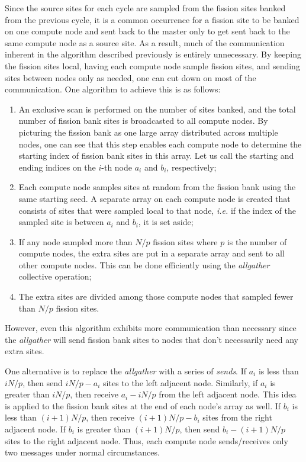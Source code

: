 Since the source sites for each cycle are sampled from the fission
sites banked from the previous cycle, it is a common occurrence for a
fission site to be banked on one compute node and sent back to the
master only to get sent back to the same compute node as a source
site. As a result, much of the communication inherent in the algorithm
described previously is entirely unnecessary. By keeping the fission
sites local, having each compute node sample fission sites, and
sending sites between nodes only as needed, one can cut down on most
of the communication. One algorithm to achieve this is as follows:

\begin{enumerate}
\item An exclusive scan is performed on the number of sites banked,
  and the total number of fission bank sites is broadcasted to all
  compute nodes. By picturing the fission bank as one large array
  distributed across multiple nodes, one can see that this step
  enables each compute node to determine the starting index of fission
  bank sites in this array. Let us call the starting and ending
  indices on the $i$-th node $a_i$ and $b_i$, respectively;
\item Each compute node samples sites at random from the fission bank
  using the same starting seed. A separate array on each compute node
  is created that consists of sites that were sampled local to that
  node, {\em i.e.} if the index of the sampled site is between $a_i$
  and $b_i$, it is set aside;
\item If any node sampled more than $N/p$ fission sites where $p$ is
  the number of compute nodes, the extra sites are put in a separate
  array and sent to all other compute nodes. This can be done
  efficiently using the \emph{allgather} collective operation;
\item The extra sites are divided among those compute nodes that
  sampled fewer than $N/p$ fission sites.
\end{enumerate}

However, even this algorithm exhibits more communication than
necessary since the \emph{allgather} will send fission bank sites to
nodes that don't necessarily need any extra sites.

One alternative is to replace the \emph{allgather} with a series of
\emph{sends}. If $a_i$ is less than $iN/p$, then send $iN/p - a_i$
sites to the left adjacent node. Similarly, if $a_i$ is greater than
$iN/p$, then receive $a_i - iN/p$ from the left adjacent node. This
idea is applied to the fission bank sites at the end of each node's
array as well. If $b_i$ is less than $(i+1)N/p$, then receive
$(i+1)N/p - b_i$ sites from the right adjacent node. If $b_i$ is
greater than $(i+1)N/p$, then send $b_i - (i+1)N/p$ sites to the right
adjacent node. Thus, each compute node sends/receives only two
messages under normal circumstances.

